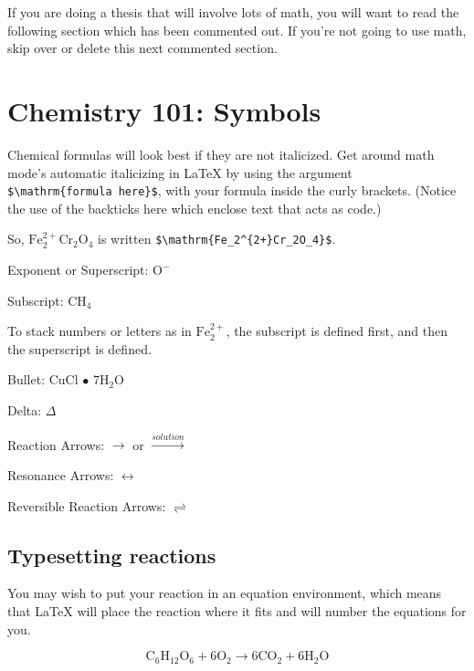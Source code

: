 \documentclass[print]{nuthesis}
\begin{document}
If you are doing a thesis that will involve lots of math, you will want to read the following section which has been commented out. If you're not going to use math, skip over or delete this next commented section.

\hypertarget{chemistry-101-symbols}{%
\section{Chemistry 101: Symbols}\label{chemistry-101-symbols}}

Chemical formulas will look best if they are not italicized. Get around math mode's automatic italicizing in LaTeX by using the argument \texttt{\$\textbackslash{}mathrm\{formula\ here\}\$}, with your formula inside the curly brackets. (Notice the use of the backticks here which enclose text that acts as code.)

So, \(\mathrm{Fe_2^{2+}Cr_2O_4}\) is written \texttt{\$\textbackslash{}mathrm\{Fe\_2\^{}\{2+\}Cr\_2O\_4\}\$}.

\noindent Exponent or Superscript: \(\mathrm{O^-}\)

\noindent Subscript: \(\mathrm{CH_4}\)

To stack numbers or letters as in \(\mathrm{Fe_2^{2+}}\), the subscript is defined first, and then the superscript is defined.

\noindent Bullet: CuCl \(\bullet\) \(\mathrm{7H_{2}O}\)

\noindent Delta: \(\Delta\)

\noindent Reaction Arrows: \(\longrightarrow\) or \(\xrightarrow{solution}\)

\noindent Resonance Arrows: \(\leftrightarrow\)

\noindent Reversible Reaction Arrows: \(\rightleftharpoons\)

\hypertarget{typesetting-reactions}{%
\subsection{Typesetting reactions}\label{typesetting-reactions}}

You may wish to put your reaction in an equation environment, which means that LaTeX will place the reaction where it fits and will number the equations for you.

\begin{equation}
  \mathrm{C_6H_{12}O_6  + 6O_2} \longrightarrow \mathrm{6CO_2 + 6H_2O}
  \label{eq:reaction}
\end{equation}
\end{document}
